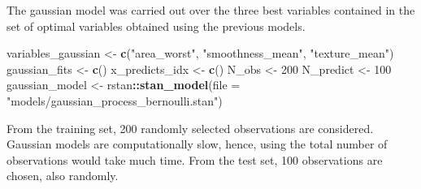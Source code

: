 \documentclass[
]{article}
\newenvironment{Shaded}{\begin{snugshade}}{\end{snugshade}}
\newcommand{\DataTypeTok}[1]{\textcolor[rgb]{0.13,0.29,0.53}{#1}}
\newcommand{\DecValTok}[1]{\textcolor[rgb]{0.00,0.00,0.81}{#1}}
\newcommand{\KeywordTok}[1]{\textcolor[rgb]{0.13,0.29,0.53}{\textbf{#1}}}
\newcommand{\NormalTok}[1]{#1}
\newcommand{\OperatorTok}[1]{\textcolor[rgb]{0.81,0.36,0.00}{\textbf{#1}}}
\newcommand{\StringTok}[1]{\textcolor[rgb]{0.31,0.60,0.02}{#1}}
\begin{document}
The gaussian model was carried out over the three best variables
contained in the set of optimal variables obtained using the previous
models.

\begin{Shaded}
\begin{Highlighting}[]
\NormalTok{variables_gaussian <-}\StringTok{ }\KeywordTok{c}\NormalTok{(}\StringTok{"area_worst"}\NormalTok{, }\StringTok{"smoothness_mean"}\NormalTok{, }\StringTok{"texture_mean"}\NormalTok{)}
\NormalTok{gaussian_fits <-}\StringTok{ }\KeywordTok{c}\NormalTok{()}
\NormalTok{x_predicts_idx <-}\StringTok{ }\KeywordTok{c}\NormalTok{()}
\NormalTok{N_obs <-}\StringTok{ }\DecValTok{200}
\NormalTok{N_predict <-}\StringTok{ }\DecValTok{100}
\NormalTok{gaussian_model <-}\StringTok{ }\NormalTok{rstan}\OperatorTok{::}\KeywordTok{stan_model}\NormalTok{(}\DataTypeTok{file =} 
                                      \StringTok{"models/gaussian_process_bernoulli.stan"}\NormalTok{)}
\end{Highlighting}
\end{Shaded}

From the training set, 200 randomly selected observations are
considered. Gaussian models are computationally slow, hence, using the
total number of observations would take much time. From the test set,
100 observations are chosen, also randomly.
\end{document}
